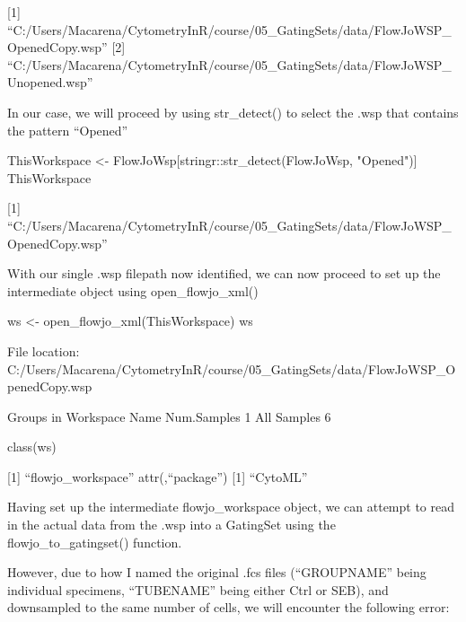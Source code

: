 \documentclass[
  letterpaper,
  DIV=11,
  numbers=noendperiod]{scrartcl}
\newenvironment{Shaded}{\begin{snugshade}}{\end{snugshade}}
\newcommand{\FunctionTok}[1]{\textcolor[rgb]{0.28,0.35,0.67}{#1}}
\newcommand{\NormalTok}[1]{\textcolor[rgb]{0.00,0.23,0.31}{#1}}
\newcommand{\OtherTok}[1]{\textcolor[rgb]{0.00,0.23,0.31}{#1}}
\newcommand{\SpecialCharTok}[1]{\textcolor[rgb]{0.37,0.37,0.37}{#1}}
\newcommand{\StringTok}[1]{\textcolor[rgb]{0.13,0.47,0.30}{#1}}
\begin{document}
{[}1{]}
``C:/Users/Macarena/CytometryInR/course/05\_GatingSets/data/FlowJoWSP\_OpenedCopy.wsp''
{[}2{]}
``C:/Users/Macarena/CytometryInR/course/05\_GatingSets/data/FlowJoWSP\_Unopened.wsp''

In our case, we will proceed by using str\_detect() to select the .wsp
that contains the pattern ``Opened''

\begin{Shaded}
\begin{Highlighting}[]
\NormalTok{ThisWorkspace }\OtherTok{\textless{}{-}}\NormalTok{ FlowJoWsp[stringr}\SpecialCharTok{::}\FunctionTok{str\_detect}\NormalTok{(FlowJoWsp, }\StringTok{"Opened"}\NormalTok{)]}
\NormalTok{ThisWorkspace}
\end{Highlighting}
\end{Shaded}

{[}1{]}
``C:/Users/Macarena/CytometryInR/course/05\_GatingSets/data/FlowJoWSP\_OpenedCopy.wsp''

With our single .wsp filepath now identified, we can now proceed to set
up the intermediate object using open\_flowjo\_xml()

\begin{Shaded}
\begin{Highlighting}[]
\NormalTok{ws }\OtherTok{\textless{}{-}} \FunctionTok{open\_flowjo\_xml}\NormalTok{(ThisWorkspace)}
\NormalTok{ws}
\end{Highlighting}
\end{Shaded}

File location:
C:/Users/Macarena/CytometryInR/course/05\_GatingSets/data/FlowJoWSP\_OpenedCopy.wsp

Groups in Workspace Name Num.Samples 1 All Samples 6

\begin{Shaded}
\begin{Highlighting}[]
\FunctionTok{class}\NormalTok{(ws)}
\end{Highlighting}
\end{Shaded}

{[}1{]} ``flowjo\_workspace'' attr(,``package'') {[}1{]} ``CytoML''

Having set up the intermediate flowjo\_workspace object, we can attempt
to read in the actual data from the .wsp into a GatingSet using the
flowjo\_to\_gatingset() function.

However, due to how I named the original .fcs files (``GROUPNAME'' being
individual specimens, ``TUBENAME'' being either Ctrl or SEB), and
downsampled to the same number of cells, we will encounter the following
error:
\end{document}

